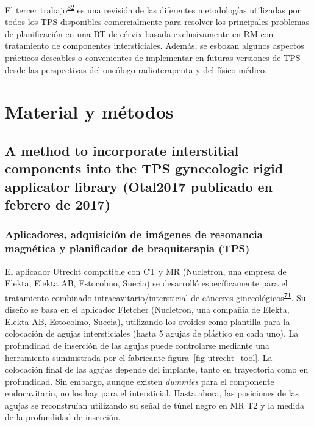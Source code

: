 \documentclass[
  a4paper,
]{scrreprt}
\begin{document}
El tercer trabajo\textsuperscript{\protect\hyperlink{ref-otal2022}{82}}
es una revisión de las diferentes metodologías utilizadas por todos los
TPS disponibles comercialmente para resolver los principales problemas
de planificación en una BT de cérvix basada exclusivamente en RM con
tratamiento de componentes intersticiales. Además, se esbozan algunos
aspectos prácticos deseables o convenientes de implementar en futuras
versiones de TPS desde las perspectivas del oncólogo radioterapeuta y
del físico médico.


\hypertarget{material-y-muxe9todos}{%
\chapter{Material y métodos}\label{material-y-muxe9todos}}

\hypertarget{a-method-to-incorporate-interstitial-components-into-the-tps-gynecologic-rigid-applicator-library-otal2017-publicado-en-febrero-de-2017}{%
\section{A method to incorporate interstitial components into the TPS
gynecologic rigid applicator library (Otal2017 publicado en febrero de
2017)}\label{a-method-to-incorporate-interstitial-components-into-the-tps-gynecologic-rigid-applicator-library-otal2017-publicado-en-febrero-de-2017}}

\hypertarget{sec-appimagestps}{%
\subsection{Aplicadores, adquisición de imágenes de resonancia magnética
y planificador de braquiterapia (TPS)}\label{sec-appimagestps}}

El aplicador Utrecht compatible con CT y MR (Nucletron, una empresa de
Elekta, Elekta AB, Estocolmo, Suecia) se desarrolló específicamente para
el tratamiento combinado intracavitario/intersticial de cánceres
ginecológicos\textsuperscript{\protect\hyperlink{ref-nomden2012}{71}}.
Su diseño se basa en el aplicador Fletcher (Nucletron, una compañía de
Elekta, Elekta AB, Estocolmo, Suecia), utilizando los ovoides como
plantilla para la colocación de agujas intersticiales (hasta 5 agujas de
plástico en cada uno). La profundidad de inserción de las agujas puede
controlarse mediante una herramienta suministrada por el fabricante
figura~\ref{fig-utrecht_tool}. La colocación final de las agujas depende
del implante, tanto en trayectoria como en profundidad. Sin embargo,
aunque existen \emph{dummies} para el componente endocavitario, no los
hay para el intersticial. Hasta ahora, las posiciones de las agujas se
reconstruían utilizando su señal de túnel negro en MR T2 y la medida de
la profundidad de inserción.
\end{document}
